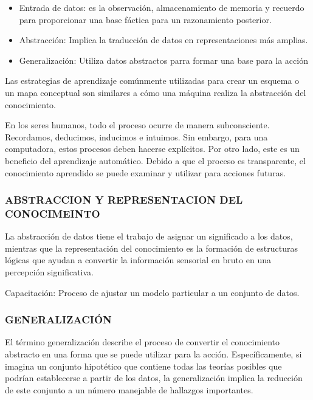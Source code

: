\documentclass[
  letterpaper,
  DIV=11,
  numbers=noendperiod]{scrartcl}
\begin{document}
\begin{itemize}
\item
  Entrada de datos: es la observación, almacenamiento de memoria y
  recuerdo para proporcionar una base fáctica para un razonamiento
  posterior.
\item
  Abstracción: Implica la traducción de datos en representaciones más
  amplias.
\item
  Generalización: Utiliza datos abstractos parra formar una base para la
  acción
\end{itemize}

Las estrategias de aprendizaje comúnmente utilizadas para crear un
esquema o un mapa conceptual son similares a cómo una máquina realiza la
abstracción del conocimiento.

En los seres humanos, todo el proceso ocurre de manera subconsciente.
Recordamos, deducimos, inducimos e intuimos. Sin embargo, para una
computadora, estos procesos deben hacerse explícitos. Por otro lado,
este es un beneficio del aprendizaje automático. Debido a que el proceso
es transparente, el conocimiento aprendido se puede examinar y utilizar
para acciones futuras.

\hypertarget{abstraccion-y-representacion-del-conocimeinto}{%
\subsubsection{\texorpdfstring{\textbf{ABSTRACCION Y REPRESENTACION DEL
CONOCIMEINTO}}{ABSTRACCION Y REPRESENTACION DEL CONOCIMEINTO}}\label{abstraccion-y-representacion-del-conocimeinto}}

La abstracción de datos tiene el trabajo de asignar un significado a los
datos, mientras que la representación del conocimiento es la formación
de estructuras lógicas que ayudan a convertir la información sensorial
en bruto en una percepción significativa.

Capacitación: Proceso de ajustar un modelo particular a un conjunto de
datos.

\hypertarget{generalizaciuxf3n}{%
\subsubsection{\texorpdfstring{\textbf{GENERALIZACIÓN}}{GENERALIZACIÓN}}\label{generalizaciuxf3n}}

El término generalización describe el proceso de convertir el
conocimiento abstracto en una forma que se puede utilizar para la
acción. Específicamente, si imagina un conjunto hipotético que contiene
todas las teorías posibles que podrían establecerse a partir de los
datos, la generalización implica la reducción de este conjunto a un
número manejable de hallazgos importantes.
\end{document}
